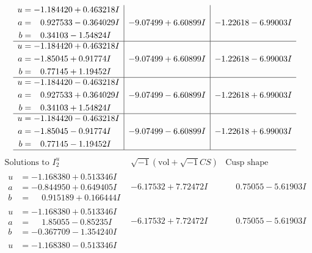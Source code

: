 \documentclass[1p]{elsarticle_modified}
\theoremstyle{definition}
\newcommand{\I}{\sqrt{-1}}
\begin{document}
$$\begin{array}{c|c|c}
\begin{aligned}
u &= -1.184420 + 0.463218 I \\
a &= \phantom{-}0.927533 - 0.364029 I \\
b &= \phantom{-}0.34103 - 1.54824 I\end{aligned}
 & -9.07499 + 6.60899 I & -1.22618 - 6.99003 I \\ \hline\begin{aligned}
u &= -1.184420 + 0.463218 I \\
a &= -1.85045 + 0.91774 I \\
b &= \phantom{-}0.77145 + 1.19452 I\end{aligned}
 & -9.07499 + 6.60899 I & -1.22618 - 6.99003 I \\ \hline\begin{aligned}
u &= -1.184420 - 0.463218 I \\
a &= \phantom{-}0.927533 + 0.364029 I \\
b &= \phantom{-}0.34103 + 1.54824 I\end{aligned}
 & -9.07499 - 6.60899 I & -1.22618 + 6.99003 I \\ \hline\begin{aligned}
u &= -1.184420 - 0.463218 I \\
a &= -1.85045 - 0.91774 I \\
b &= \phantom{-}0.77145 - 1.19452 I\end{aligned}
 & -9.07499 - 6.60899 I & -1.22618 + 6.99003 I\\
 \hline 
 \end{array}$$\newpage$$\begin{array}{c|c|c}  
\text{Solutions to }I^u_{2}& \I (\text{vol} + \sqrt{-1}CS) & \text{Cusp shape}\\
 \hline 
\begin{aligned}
u &= -1.168380 + 0.513346 I \\
a &= -0.844950 + 0.649405 I \\
b &= \phantom{-}0.915189 + 0.166444 I\end{aligned}
 & -6.17532 + 7.72472 I & \phantom{-}0.75055 - 5.61903 I \\ \hline\begin{aligned}
u &= -1.168380 + 0.513346 I \\
a &= \phantom{-}1.85055 - 0.85235 I \\
b &= -0.367709 - 1.354240 I\end{aligned}
 & -6.17532 + 7.72472 I & \phantom{-}0.75055 - 5.61903 I \\ \hline\begin{aligned}
u &= -1.168380 - 0.513346 I \\

\end{aligned}
\end{array}$$
\end{document}
